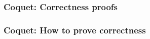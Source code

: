         \begin{frame}
            \frametitle{Coquet: Correctness proofs}
        \end{frame}

        \begin{frame}
            \frametitle{Coquet: How to prove correctness}
        \end{frame}

